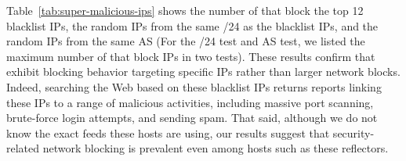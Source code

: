 

Table~\ref{tab:super-malicious-ips} shows the number of {}
that block the top 12 blacklist IPs, the random IPs from the same
/24 as the blacklist IPs, and the random IPs from the same AS (For the
/24 test and AS test, we listed the maximum number of {} that
block IPs in two tests). These
results confirm that {} exhibit blocking behavior targeting
specific IPs rather than larger network blocks.  Indeed, searching the
Web based on these blacklist IPs returns reports linking these IPs to
a range of malicious activities, including massive port scanning,
brute-force login attempts, and sending spam. That said, although we do
not know the exact feeds these hosts are using, our results suggest
that security-related network blocking is prevalent even among hosts
such as these reflectors.
